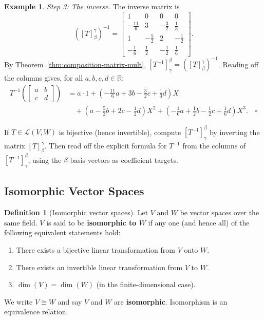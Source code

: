 \documentclass[11pt, a4paper, notitlepage]{report}
\theoremstyle{definition}
\newtheorem{definition}[theorem]{Definition}
\newtheorem{example}[theorem]{Example}
\theoremstyle{remark}
\begin{document}
\begin{example}
\emph{Step 3: The inverse.}  The inverse matrix is
\[
  \left([T]_\beta^\gamma\right)^{-1}
  = \begin{bmatrix}
      1 & 0 & 0 & 0 \\
      -\tfrac{11}{6} & 3 & -\tfrac{3}{2} & \tfrac{1}{3} \\
      1 & -\tfrac{5}{2} & 2 & -\tfrac{1}{2} \\
      -\tfrac{1}{6} & \tfrac{1}{2} & -\tfrac{1}{2} & \tfrac{1}{6}
    \end{bmatrix}.
\]
By Theorem~\ref{thm:composition-matrix-mult},
$[T^{-1}]_\gamma^\beta = \left([T]_\beta^\gamma\right)^{-1}$.  Reading off the columns gives,
for all $a,b,c,d \in \mathbb{R}$:
\begin{align*}
  T^{-1}\!\left(\begin{bmatrix}a&b\\c&d\end{bmatrix}\right)
  &= a \cdot 1 + \left(-\tfrac{11}{6}a + 3b - \tfrac{3}{2}c + \tfrac{1}{3}d\right)X \\
  &\quad + \left(a - \tfrac{5}{2}b + 2c - \tfrac{1}{2}d\right)X^2
   + \left(-\tfrac{1}{6}a + \tfrac{1}{2}b - \tfrac{1}{2}c + \tfrac{1}{6}d\right)X^3. \quad \square
\end{align*}
\end{example}

\begin{examtip}[title={Exam Tip: Finding $T^{-1}$ via the Inverse Matrix}]
If $T \in \mathcal{L}(V,W)$ is bijective (hence invertible), compute $[T^{-1}]_\gamma^\beta$
by inverting the matrix $[T]_\beta^\gamma$.  Then read off the explicit formula for $T^{-1}$
from the columns of $[T^{-1}]_\gamma^\beta$, using the $\beta$-basis vectors as coefficient
targets.
\end{examtip}

\subsection{Isomorphic Vector Spaces}

\begin{definition}[Isomorphic vector spaces]
\label{def:isomorphic}
Let $V$ and $W$ be vector spaces over the same field.  $V$ is said to be \textbf{isomorphic to
$W$} if any one (and hence all) of the following equivalent statements hold:
\begin{enumerate}
  \item There exists a bijective linear transformation from $V$ onto $W$.
  \item There exists an invertible linear transformation from $V$ to $W$.
  \item $\dim(V) = \dim(W)$ (in the finite-dimensional case).
\end{enumerate}
We write $V \cong W$ and say $V$ and $W$ are \textbf{isomorphic}.  Isomorphism is an
equivalence relation.
\end{definition}
\end{document}
